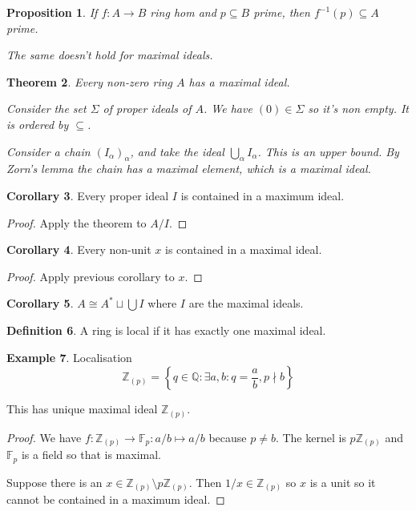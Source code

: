 \documentclass{article}
\newcommand{\Z}{\mathbb{Z}}
\newcommand{\Q}{\mathbb{Q}}
\newcommand{\F}{\mathbb{F}}
\newcommand{\setwith}[2]{\left\{#1:#2\right\}}
\newtheorem{theorem}{Theorem}[section]
\newtheorem{proposition}[theorem]{Proposition}
\theoremstyle{definition}
\newtheorem{definition}[theorem]{Definition}
\newtheorem{example}[theorem]{Example}
\newtheorem{corollary}[theorem]{Corollary}
\begin{document}
\begin{proposition}
    If \(f:A\to B\) ring hom and \(p\subseteq B\) prime, then
    \(f^{-1}(p)\subseteq A\) prime.

    The same doesn't hold for maximal ideals.
\end{proposition}

\begin{theorem}
    Every non-zero ring \(A\) has a maximal ideal.

    Consider the set \(\Sigma\) of proper ideals of \(A\). We have
    \((0)\in\Sigma\) so it's non empty. It is ordered by \(\subseteq\).

    Consider a chain \((I_{\alpha})_{\alpha}\), and take the ideal
    \(\bigcup_{\alpha}I_{\alpha}\). This is an upper bound. By Zorn's lemma
    the chain has a maximal element, which is a maximal ideal.
\end{theorem}

\begin{corollary}
    Every proper ideal \(I\) is contained in a maximum ideal.

    \begin{proof}
        Apply the theorem to \(A/I\).
    \end{proof}
\end{corollary}

\begin{corollary}
    Every non-unit \(x\) is contained in a maximal ideal.

    \begin{proof}
        Apply previous corollary to \(x\).
    \end{proof}
\end{corollary}

\begin{corollary}
    \(A\cong A^{*}\sqcup\bigcup I\) where \(I\) are the maximal ideals.
\end{corollary}

\begin{definition}
    A ring is local if it has exactly one maximal ideal.
\end{definition}

\begin{example}
    Localisation
    \[
        \Z_{(p)}=\setwith{q\in\Q}{\exists a,b:q=\frac{a}{b}, p\nmid b}
    \]

    This has unique maximal ideal \(\Z_{(p)}\).

    \begin{proof}
        We have \(f:\Z_{(p)}\to\F_{p}:a/b\mapsto a/b\) because \(p\neq b\). The
        kernel is \(p\Z_{(p)}\) and \(\F_{p}\) is a field so that is maximal.

        Suppose there is an \(x\in\Z_{(p)}\setminus p\Z_{(p)}\). Then
        \(1/x\in\Z_{(p)}\) so \(x\) is a unit so it cannot be contained in a
        maximum ideal.
    \end{proof}
\end{example}
\end{document}
